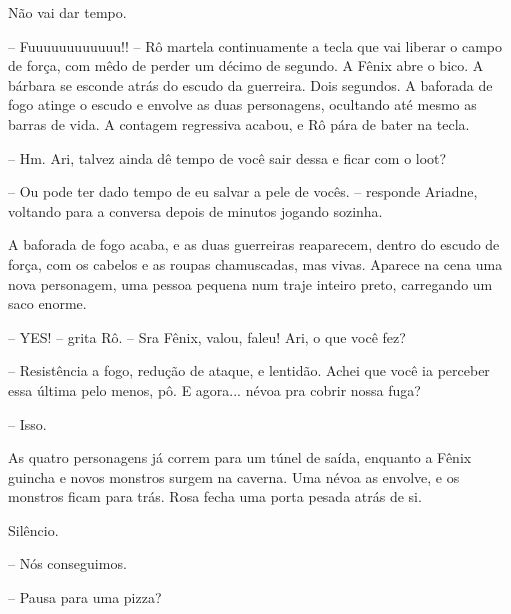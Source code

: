 Não vai dar tempo.

-- Fuuuuuuuuuuuu!! -- Rô martela continuamente a tecla que vai liberar o campo de força, com mêdo de perder um décimo de segundo.
A Fênix abre o bico. A bárbara se esconde atrás do escudo da guerreira. Dois segundos. 
A baforada de fogo atinge o escudo e envolve as duas personagens, ocultando até mesmo as barras de vida.
A contagem regressiva acabou, e Rô pára de bater na tecla.

-- Hm. Ari, talvez ainda dê tempo de você sair dessa e ficar com o loot?

-- Ou pode ter dado tempo de eu salvar a pele de vocês. -- responde Ariadne, voltando para a conversa depois de minutos jogando sozinha.

A baforada de fogo acaba, e as duas guerreiras reaparecem, dentro do escudo de força, com os cabelos e as roupas chamuscadas, mas vivas.
Aparece na cena uma nova personagem, uma pessoa pequena num traje inteiro preto, carregando um saco enorme.

-- YES! -- grita Rô. -- Sra Fênix, valou, faleu! Ari, o que você fez?

-- Resistência a fogo, redução de ataque, e lentidão. Achei que você ia perceber essa última pelo menos, pô. E agora... névoa pra cobrir nossa fuga?

-- Isso.

As quatro personagens já correm para um túnel de saída, enquanto a Fênix guincha e novos monstros surgem na caverna.
Uma névoa as envolve, e os monstros ficam para trás.
Rosa fecha uma porta pesada atrás de si.

Silêncio.

-- Nós conseguimos.

-- Pausa para uma pizza?

